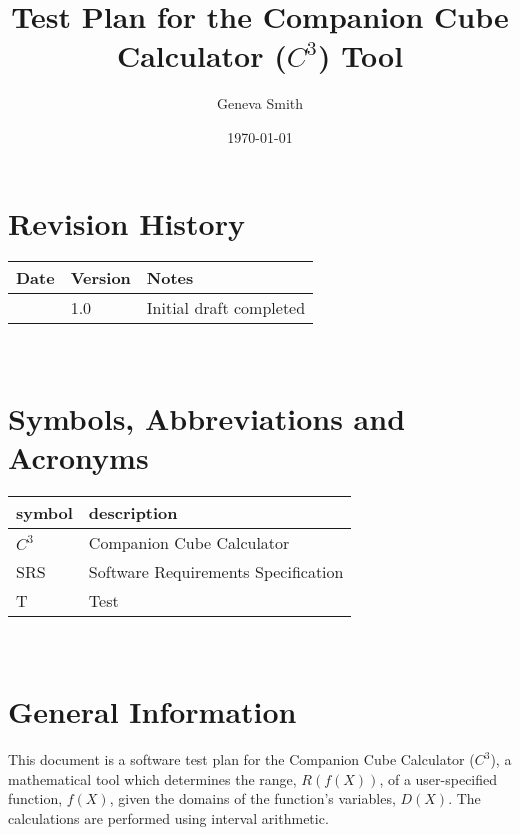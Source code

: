 \documentclass[12pt, titlepage]{article}
\newcommand{\progname}{Companion Cube Calculator} %
\newcommand{\prognameAbbrv}{$C^{3}$}
\begin{document}
\title{Test Plan for the \progname{} (\prognameAbbrv{}) Tool} 
\author{Geneva Smith}
\date{\today}
	
\maketitle


\section{Revision History}

\begin{tabularx}{\textwidth}{p{3cm}p{2cm}X}
\toprule {\bf Date} & {\bf Version} & {\bf Notes}\\
\midrule
 & 1.0 & Initial draft completed\\
\bottomrule
\end{tabularx}

~\newpage

\section{Symbols, Abbreviations and Acronyms}

\renewcommand{\arraystretch}{1.2}
\begin{tabular}{l l} 
  \toprule		
  \textbf{symbol} & \textbf{description}\\
  \midrule 
  \prognameAbbrv{} & \progname{}\\
  SRS & Software Requirements Specification\\
  T & Test\\
  \bottomrule
\end{tabular}\\


\newpage

\tableofcontents

\listoftables

\listoffigures

\newpage


\section{General Information}
This document is a software test plan for the \progname{} (\prognameAbbrv{}), a 
mathematical tool which determines the range, $R(f(X))$, of a user-specified 
function, $f(X)$, given the domains of the function's variables, $D(X)$. The 
calculations are performed using interval arithmetic.
\end{document}
